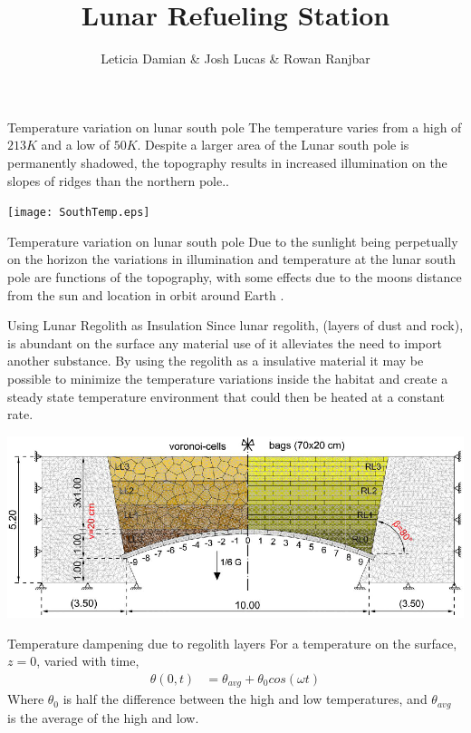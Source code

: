 \documentclass{beamer}
\title{ Lunar Refueling Station}
\author{Leticia Damian \& Josh Lucas \& Rowan Ranjbar }
\institute[CSUSM] %
{
  \inst{1}%
  Dept. of Physics\\
  California State University San Marcos
}
\date %
\begin{document}
 
\frame{\titlepage}


\begin{frame}{Temperature variation on lunar south pole}
 The temperature varies from a high of $213K $ and a low of $50K$.
 Despite a larger area of the Lunar south pole is permanently shadowed, the topography results in increased illumination on the slopes of ridges than the northern pole.\cite{Williams}.

 \begin{center}
             \texttt{[image: SouthTemp.eps]}   
      \end{center}  

\end{frame}

\begin{frame}{Temperature variation on lunar south pole}
Due to the sunlight being perpetually on the horizon the variations in illumination and temperature at the lunar south pole are functions of the topography, with some effects due to the moons distance from the sun and location in orbit around Earth \cite{Williams}.
\end{frame}


\begin{frame}{Using Lunar Regolith as Insulation}
Since lunar regolith, (layers of dust and rock), is abundant on the surface any material use of it  alleviates the need to import another substance. By using the regolith as a insulative material it may be possible to minimize the temperature variations inside the habitat and create a steady state temperature environment that could then be heated at a constant rate.
 \begin{center}
             \includegraphics[width=.75\textwidth]{bags.eps}   
      \end{center}  


\end{frame}

\begin{frame}{Temperature dampening due to regolith layers }
For a temperature on the surface, $z = 0$, varied with time,
\begin{align*}
\theta(0,t) & = \theta_{avg}+\theta_0 cos(\omega t)
\end{align*} 
Where $\theta_0$ is half the difference between the high and low temperatures, and $\theta_{avg}$ is the average of the high and low.
 
\end{frame}
\end{document}
